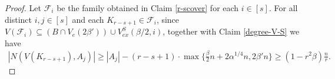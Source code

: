 \documentclass[11pt, a4paper]{article}
\theoremstyle{definition}
\newcommand{\<}{\subseteq}
\begin{document}
\begin{proof}







Let $\mathcal{F}_i$ be the family obtained in Claim \ref{r-scover} for each $i\in [s]$. %
For all distinct $i,j\in [s]$ and each $K_{r-s+1}\in \mathcal{F}_i$, since  $V(\mathcal{F}_i)\subseteq \left(B\cap V_{e}(2\beta')\right)\cup V_{ex}^S(\beta/2,i)$,  together with Claim \ref{degree-V-S} we have 
\begin{align}\label{base-F}
    |N(V(K_{r-s+1}),A_j)|\ge |A_j|-(r-s+1)\cdot \max \bigg\{\frac{\beta}{2}n+2\alpha^{1/4}n, 2\beta' n\bigg \} \ge (1-r^2\beta)\frac{n}{r}.
\end{align}


\end{proof}
\end{document}
